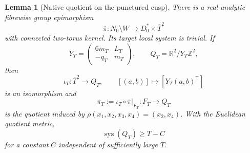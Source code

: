 \documentclass[11pt,letterpaper]{article}
\numberwithin{equation}{section}
\newtheorem{lemma}[theorem]{Lemma}
\theoremstyle{definition}
\theoremstyle{remark}
\newcommand{\R}{\mathbb R}
\newcommand{\Z}{\mathbb Z}
\newcommand{\sys}{\operatorname{sys}}
\begin{document}
\begin{lemma}[Native quotient on the punctured cusp]
\label{lem:native-quotient}
There is a real-analytic fibrewise group epimorphism
\begin{equation}
 \overline\pi:N_0\setminus W\longrightarrow D_0^*\times\overline T^2
 \label{eq:bar-pi}
\end{equation}
with connected two-torus kernel.  Its target local system is trivial.  If
\begin{equation}
 Y_T=\begin{pmatrix}6m_T&L_T\\-q_T&m_T\end{pmatrix},
 \qquad Q_T=\R^2/Y_T\Z^2,
 \label{eq:Y-and-Q}
\end{equation}
then
\begin{equation}
 \iota_T:\overline T^2\longrightarrow Q_T,\qquad
 [(a,b)]\longmapsto[Y_T(a,b)^{\mathsf T}]
 \label{eq:iota}
\end{equation}
is an isomorphism and
\begin{equation}
 \pi_T:=\iota_T\circ\overline\pi|_{F_T}:
 F_T\longrightarrow Q_T
 \label{eq:pi-T}
\end{equation}
is the quotient induced by
$\rho(x_1,x_2,x_3,x_4)=(x_2,x_4)$.  With the Euclidean quotient metric,
\begin{equation}
 \sys(Q_T)\ge T-C
 \label{eq:QT-systole}
\end{equation}
for a constant $C$ independent of sufficiently large $T$.
\end{lemma}
\end{document}
